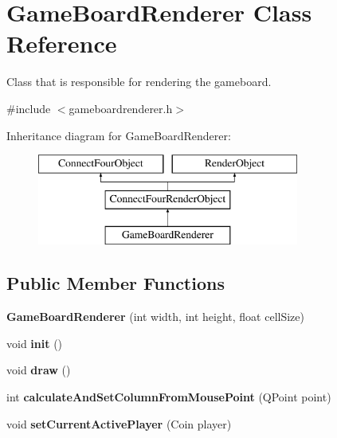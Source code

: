 \hypertarget{classGameBoardRenderer}{\section{\-Game\-Board\-Renderer \-Class \-Reference}
\label{classGameBoardRenderer}
}


\-Class that is responsible for rendering the gameboard.  




{\ttfamily \#include $<$gameboardrenderer.\-h$>$}

\-Inheritance diagram for \-Game\-Board\-Renderer\-:\begin{figure}[H]
\begin{center}
\leavevmode
\includegraphics[height=3.000000cm]{classGameBoardRenderer}
\end{center}
\end{figure}
\subsection*{\-Public \-Member \-Functions}
\begin{DoxyCompactItemize}
\item 
\hypertarget{classGameBoardRenderer_a7ca6fb62b4ed41b70d7e8883e31d20a2}{{\bfseries \-Game\-Board\-Renderer} (int width, int height, float cell\-Size)}\label{classGameBoardRenderer_a7ca6fb62b4ed41b70d7e8883e31d20a2}

\item 
\hypertarget{classGameBoardRenderer_a5b45052cf71976461b07721195dd5dbe}{void {\bfseries init} ()}\label{classGameBoardRenderer_a5b45052cf71976461b07721195dd5dbe}

\item 
\hypertarget{classGameBoardRenderer_a9daf708f14cd6accf1e2f4cc54bb7d56}{void {\bfseries draw} ()}\label{classGameBoardRenderer_a9daf708f14cd6accf1e2f4cc54bb7d56}

\item 
\hypertarget{classGameBoardRenderer_a816b3c402bf466641681ed67cefe1041}{int {\bfseries calculate\-And\-Set\-Column\-From\-Mouse\-Point} (\-Q\-Point point)}\label{classGameBoardRenderer_a816b3c402bf466641681ed67cefe1041}

\item 
\hypertarget{classGameBoardRenderer_a5678cf7626743de3844406465ca2bf6f}{void {\bfseries set\-Current\-Active\-Player} (\-Coin player)}\label{classGameBoardRenderer_a5678cf7626743de3844406465ca2bf6f}

\end{DoxyCompactItemize}


